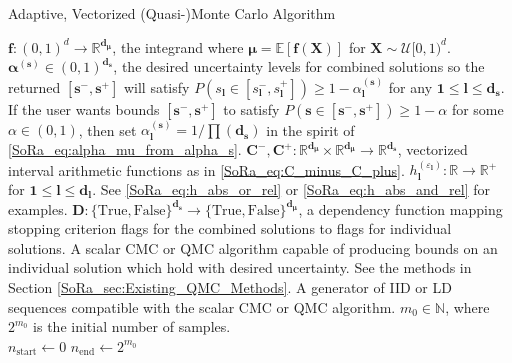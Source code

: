 \documentclass[graybox]{svmult}
\begin{document}
\begin{algorithm}[t]
    \caption{Adaptive, Vectorized (Quasi-)Monte Carlo Algorithm}
    \label{SoRa_algo:MCStoppingCriterion}
    \begin{algorithmic}
    \Require $\boldsymbol{f}: (0,1)^d \to \mathbb{R}^{\boldsymbol{d}_{\boldsymbol{\mu}}}$, the integrand where $\boldsymbol{\mu} = \mathbb{E}[\boldsymbol{f}(\boldsymbol{X})]$ for $\boldsymbol{X} \sim \mathcal{U}[0,1)^d$.
    \Require $\boldsymbol{\alpha}^{(\boldsymbol{s})} \in (0,1)^{\boldsymbol{d}_{\boldsymbol{s}}}$, the desired uncertainty levels for combined solutions so the returned $[\boldsymbol{s}^-,\boldsymbol{s}^+]$ will satisfy $P(s_{\boldsymbol{l}} \in [s_{\boldsymbol{l}}^-,s_{\boldsymbol{l}}^+]) \geq 1-\alpha^{(\boldsymbol{s})}_{\boldsymbol{l}}$ for any $\boldsymbol{1} \leq \boldsymbol{l} \leq \boldsymbol{d}_{\boldsymbol{s}}$. If the user wants bounds $[\boldsymbol{s}^-,\boldsymbol{s}^+]$ to satisfy $P(\boldsymbol{s} \in [\boldsymbol{s}^-,\boldsymbol{s}^+]) \geq 1-\alpha$ for some $\alpha \in (0,1)$, then set $\alpha_{\boldsymbol{l}}^{(\boldsymbol{s})} = 1/\prod(\boldsymbol{d}_{\boldsymbol{s}})$ in the spirit of \eqref{SoRa_eq:alpha_mu_from_alpha_s}.
    \Require $\boldsymbol{C}^-,\boldsymbol{C}^+: \mathbb{R}^{\boldsymbol{d}_{\boldsymbol{\mu}}} \times \mathbb{R}^{\boldsymbol{d}_{\boldsymbol{\mu}}} \to \mathbb{R}^{\boldsymbol{d}_{\boldsymbol{s}}}$, vectorized interval arithmetic functions as in \eqref{SoRa_eq:C_minus_C_plus}.
    \Require $h^{(\varepsilon_{\boldsymbol{l}})}_{\boldsymbol{l}}: \mathbb{R} \to \mathbb{R}^+$ for $\boldsymbol{1} \leq \boldsymbol{l} \leq \boldsymbol{d}_{\boldsymbol{l}}$. See \eqref{SoRa_eq:h_abs_or_rel} or \eqref{SoRa_eq:h_abs_and_rel} for examples.
    \Require $\boldsymbol{D}: \{\text{True},\text{False}\}^{\boldsymbol{d}_{\boldsymbol{s}}} \to \{\text{True},\text{False}\}^{\boldsymbol{d}_{\boldsymbol{\mu}}}$, a dependency function mapping stopping criterion flags for the combined solutions to flags for individual solutions. 
    \Require A scalar CMC or QMC algorithm capable of producing bounds on an individual solution which hold with desired uncertainty. See the methods in Section \ref{SoRa_sec:Existing_QMC_Methods}.
    \Require A generator of IID or LD sequences compatible with the scalar CMC or QMC algorithm. 
    \Require $m_0 \in \mathbb{N}$, where $2^{m_0}$ is the initial number of samples.
    \\ \hrulefill
    \State $n_\text{start} \gets 0$ 
    \State $n_\text{end} \gets 2^{m_0}$ 

\end{algorithmic}
\end{algorithm}
\end{document}
